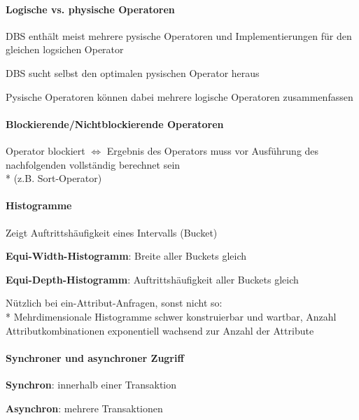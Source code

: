 \paragraph{Logische vs. physische Operatoren}
\begin{items}
	\item DBS enthält meist mehrere pysische Operatoren und Implementierungen für den gleichen logsichen Operator
	\item DBS sucht selbst den optimalen pysischen Operator heraus
	\item Pysische Operatoren können dabei mehrere logische Operatoren zusammenfassen
\end{items}

\paragraph{Blockierende/Nichtblockierende Operatoren}
\begin{items}
	\item Operator blockiert \( \Leftrightarrow \) Ergebnis des Operators muss vor Ausführung des nachfolgenden vollständig berechnet sein \\* (z.B. Sort-Operator)
\end{items}

\paragraph{Histogramme}
\begin{items}
	\item Zeigt Auftrittshäufigkeit eines Intervalls (Bucket)
	\item \textbf{Equi-Width-Histogramm}: Breite aller Buckets gleich
	\item \textbf{Equi-Depth-Histogramm}: Auftrittshäufigkeit aller Buckets gleich
	\item Nützlich bei ein-Attribut-Anfragen, sonst nicht so:
		\\*
		Mehrdimensionale Histogramme schwer konstruierbar und wartbar, Anzahl Attributkombinationen exponentiell wachsend zur Anzahl der Attribute
\end{items}

\paragraph{Synchroner und asynchroner Zugriff}
\begin{items}
	\item \textbf{Synchron}: innerhalb einer Transaktion
	\item \textbf{Asynchron}: mehrere Transaktionen
\end{items}

